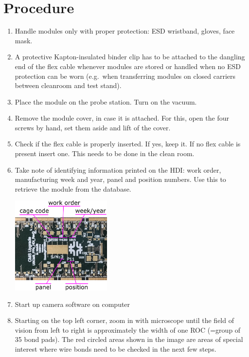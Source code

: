 \documentclass[12pt]{unlsilabsop}
\begin{document}
\section{Procedure}

\begin{enumerate}
    \item Handle modules only with proper protection: ESD wristband, gloves, face mask.
    \item A protective Kapton-insulated binder clip has to be attached to the dangling end of the flex cable whenever modules are stored or handled when no ESD protection can be worn (e.g.~when transferring modules on closed carriers between cleanroom and test stand).
    \item Place the module on the probe station. Turn on the vacuum.
    \item Remove the module cover, in case it is attached. For this, open the four screws by hand, set them aside and lift of the cover.
    \item Check if the flex cable is properly inserted. If yes, keep it. If no flex cable is present insert one. This needs to be done in the clean room.
    \item Take note of identifying information printed on the HDI: work order, manufacturing week and year, panel and position numbers. Use this to retrieve the module from the database.

    \begin{center}
        \includegraphics[width=5cm]{img/HDIRevD_id.png}
    \end{center}

    \item Start up camera software on computer
    \item Starting on the top left corner, zoom in with microscope until the field of vision from left to right is approximately the width of one ROC (=group of 35 bond pads). The red circled areas shown in the image are areas of special interest where wire bonds need to be checked in the next few steps.


\end{enumerate}
\end{document}
